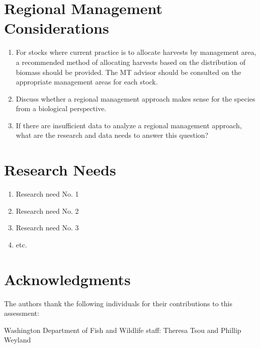 \documentclass[12pt,]{article}
\providecommand{\tightlist}{%
  \setlength{\itemsep}{0pt}\setlength{\parskip}{0pt}}
\begin{document}
\newpage

\section{Regional Management
Considerations}\label{regional-management-considerations}

\begin{enumerate}
\def\labelenumi{\arabic{enumi}.}
\tightlist
\item
  For stocks where current practice is to allocate harvests by
  management area, a recommended method of allocating harvests based on
  the distribution of biomass should be provided. The MT advisor should
  be consulted on the appropriate management areas for each stock.
\item
  Discuss whether a regional management approach makes sense for the
  species from a biological perspective.
\item
  If there are insufficient data to analyze a regional management
  approach, what are the research and data needs to answer this
  question?
\end{enumerate}

\newpage

\section{Research Needs}\label{research-needs}

\begin{enumerate}

\item Research need No. 1

\item Research need No. 2

\item Research need No. 3

\item etc.

\end{enumerate}

\newpage

\section{Acknowledgments}\label{acknowledgments}

The authors thank the following individuals for their contributions to
this assessment:

Washington Department of Fish and Wildlife staff: Theresa Tsou and
Phillip Weyland
\end{document}
